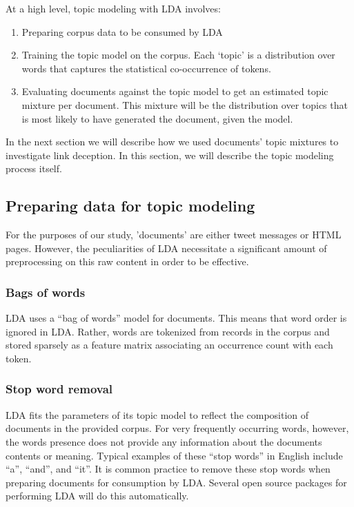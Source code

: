 \documentclass[times, 11pt, twocolumn]{article}
\begin{document}
At a high level, topic modeling with LDA involves:
\begin{enumerate}
\item Preparing corpus data to be consumed by LDA
\item Training the topic model on the corpus.  Each `topic' is a distribution over words that captures the statistical co-occurrence of tokens.
\item Evaluating documents against the topic model to get an estimated topic mixture per document.  This mixture will be the distribution over topics that is most likely to have generated the document, given the model.
\end{enumerate}

In the next section we will describe how we used documents' topic mixtures to investigate link deception.
In this section, we will describe the topic modeling process itself.


\subsection{Preparing data for topic modeling}

For the purposes of our study, 'documents' are either tweet messages or HTML pages.
However, the peculiarities of LDA necessitate a significant amount of preprocessing on this raw content in order to be effective.

\subsubsection{Bags of words}

LDA uses a ``bag of words'' model for documents.
This means that word order is ignored in LDA.
Rather, words are tokenized from records in the corpus and stored sparsely as a feature matrix associating an occurrence count with each token.

\subsubsection{Stop word removal}

LDA fits the parameters of its topic model to reflect the composition of documents in the provided corpus.
For very frequently occurring words, however, the words presence does not provide any information about the documents contents or meaning.
Typical examples of these ``stop words'' in English include ``a'', ``and'', and ``it''.
It is common practice to remove these stop words when preparing documents for consumption by LDA.
Several open source packages for performing LDA will do this automatically.
\end{document}
